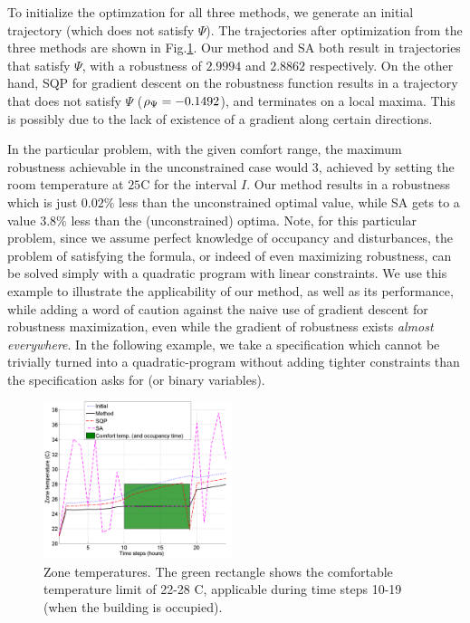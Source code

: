 To initialize the optimzation for all three methods, we generate an initial trajectory (which does not satisfy $\Psi$). The trajectories after optimization from the three methods are shown in Fig.\ref{fig:ZoneTemp}. Our method and SA both result in trajectories that satisfy $\Psi$, with a robustness of $2.9994$ and $2.8862$ respectively. On the other hand, SQP for gradient descent on the robustness function results in a trajectory that does not satisfy $\Psi$ ($\rho_{\Psi} = -0.1492$), and terminates on a local maxima. This is possibly due to the lack of existence of a gradient along certain directions. 

In the particular problem, with the given comfort range, the maximum robustness achievable in the unconstrained case would $3$, achieved by setting the room temperature at $25$C for the interval $I$. Our method results in a robustness which is just $0.02\%$ less than the unconstrained optimal value, while SA gets to a value $3.8\%$ less than the (unconstrained) optima. Note, for this particular problem, since we assume perfect knowledge of occupancy and disturbances, the problem of satisfying the formula, or indeed of even maximizing robustness, can be solved simply with a quadratic program with linear constraints. We use this example to illustrate the applicability of our method, as well as its performance, while adding a word of caution against the naive use of gradient descent for robustness maximization, even while the gradient of robustness exists \textit{almost everywhere}. In the following example, we take a specification which cannot be trivially turned into a quadratic-program without adding tighter constraints than the specification asks for (or binary variables).


\begin{figure}[t]
\centering
\includegraphics[width=0.49\textwidth]{figures/ZoneTemp_scissored}
\caption{Zone temperatures. The green rectangle shows the comfortable temperature limit of 22-28 C, applicable during time steps 10-19 (when the building is occupied).}
\label{fig:ZoneTemp}
\end{figure}

